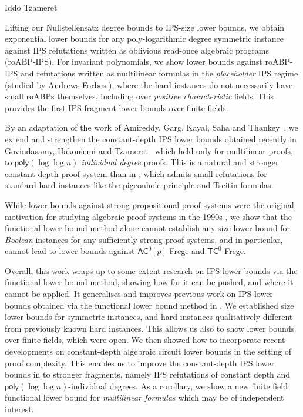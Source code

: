 \documentclass[report]{owrart}
\begin{document}
\begin{report}
\begin{talk}{Iddo Tzameret}
\begin{description}[align=left]
\item [\textbf{Lifting to size lower bounds}] Lifting our Nullstellensatz  
    degree bounds to  IPS-size lower bounds, we obtain exponential lower 
    bounds for any  poly-logarithmic degree symmetric instance 
    against IPS refutations
    written as oblivious read-once algebraic programs (roABP-IPS).   
    For invariant polynomials, we show lower bounds against roABP-IPS
    and refutations written as multilinear formulas in the \emph{placeholder} IPS regime
    (studied by Andrews-Forbes \cite{AF22}), where the hard instances
    do not necessarily have small roABPs themselves, including over
    \emph{positive characteristic} fields. This provides the first
    IPS-fragment lower bounds over finite fields. 

    By an adaptation of the work of Amireddy, Garg, Kayal, Saha and Thankey~\cite{AGK0T23}, we extend and strengthen the constant-depth IPS lower bounds obtained recently in Govindasamy, Hakoniemi and Tzameret~\cite{GHT22} which held only for multilinear proofs, to \emph{$\mathsf{poly}(\log \log n)$ individual degree} proofs. 
    This is a natural and stronger constant depth proof system than in \cite{GHT22}, which admits small refutations for standard hard instances like the pigeonhole principle and Tseitin formulas.  

\item [\textbf{Barriers for  Boolean instances}] 
    While lower bounds against strong propositional proof
    systems were the original motivation for studying algebraic     
    proof systems in the 1990s \cite{BeameIKPP96,BussIKPRS96},   
    we show that the functional lower bound method alone cannot establish any size lower bound for \textit{Boolean} instances for any sufficiently strong proof systems, and in particular, cannot lead to lower bounds against $\mathsf{AC}^0[p]$-Frege and $\mathsf{TC}^0$-Frege.  
\end{description}



Overall, this work wraps up to some extent research on IPS lower bounds via the functional lower bound method, showing how far it can be pushed, and where it cannot be applied. It generalises and improves previous work on IPS lower bounds obtained via the functional lower bound method in \cite{FSTW21,GHT22}. 
We established size lower bounds for symmetric instances, and hard instances qualitatively different from previously known hard instances. This allows us also to show lower bounds over finite fields, which were open. 
We then showed how to incorporate recent developments on constant-depth algebraic circuit lower bounds \cite{AGK0T23} in the setting of proof complexity. This enables us to improve the constant-depth IPS lower bounds in \cite{GHT22} to stronger fragments, namely IPS refutations of constant depth and $\mathsf{poly}(\log\log n)$-individual degrees. 
As a corollary, we show a new finite field functional lower bound for \emph{multilinear formulas} which may be of independent interest.


\end{talk}
\end{report}
\end{document}
